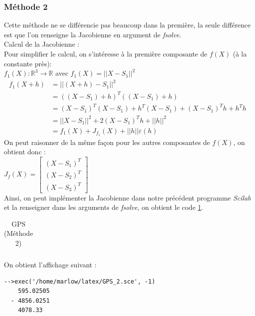\documentclass[a4paper,10pt]{report}
\begin{document}
\subsubsection{Méthode 2}
Cette méthode ne se différencie pas beaucoup dans la première, la seule différence est que l'on renseigne la Jacobienne en argument de \textit{fsolve}.\\
Calcul de la Jacobienne :\\
Pour simplifier le calcul, on s'intéresse à la première composante de $f(X)$ (à la constante près):\\ $f_1(X) : \mathbb{R}^3 \longrightarrow \mathbb{R}$ avec $f_1(X)=||X-S_1||^2$
\begin{align*}
   f_1(X+h) & = ||(X+h)-S_1||^2 \\
   & = ((X-S_1)+h)^T((X-S_1)+h) \\
   & = (X-S_1)^T(X-S_1) + h^T(X-S_1) + (X-S_1)^Th +h^Th \\
   & = ||X-S_1||^2 + 2(X-S_1)^Th +||h||^2 \\
   & = f_1(X) + J_{f_1}(X) + ||h||\varepsilon(h)
\end{align*}
On peut raisonner de la même façon pour les autres composantes de $f(X)$, on obtient donc :\\
$J_f(X) = \left[ \begin{array}{c} (X-S_1)^T \\ (X-S_2)^T \\ (X-S_3)^T \end{array} \right]$\\
Ainsi, on peut implémenter la Jacobienne dans notre précédent programme \textit{Scilab} et la renseigner dans les arguments de \textit{fsolve}, on obtient le code \ref{GPS2}.

\begin{table}[H]
\caption{GPS (Méthode 2)}
\begin{tabular}{l}
\\
\end{tabular}
\label{GPS2}
\end{table}

On obtient l'affichage suivant :
\begin{verbatim}
-->exec('/home/marlow/latex/GPS_2.sce', -1)
    595.02505  
  - 4856.0251  
    4078.33   
\end{verbatim}
\end{document}
